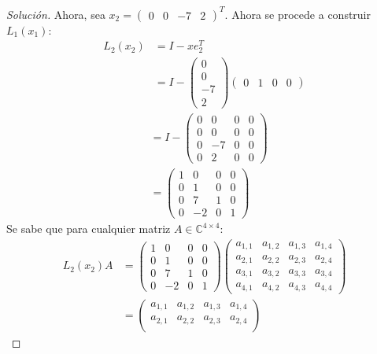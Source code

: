 \documentclass[12pt]{book}
\newcommand{\C}{\mathbb{C}}
\newenvironment{solucion}
  {\renewcommand\qedsymbol{$\square$}\begin{proof}[Solución]}
  {\end{proof}}
\begin{document}
\begin{solucion}
Ahora, sea $x_2=\begin{pmatrix}0&0&-7&2\end{pmatrix}^T$. Ahora se procede a construir $L_1(x_1)$:
\begin{align*}
    L_2(x_2)&=I-xe_2^T\\[8pt]
    &=I-\begin{pmatrix}
    0\\
    0\\
    -7\\
    2
    \end{pmatrix}\begin{pmatrix}
    0 & 1 & 0 & 0
    \end{pmatrix}
\end{align*}
\begin{align*}
    &= I-\begin{pmatrix}
    0 & 0 & 0 & 0\\
    0 & 0 & 0 & 0\\
    0 & -7 & 0 & 0\\
    0 & 2 & 0 & 0
    \end{pmatrix}\\[8pt]
    &=\begin{pmatrix}
    1 & 0 & 0 & 0\\
    0 & 1 & 0 & 0\\
    0 & 7 & 1 & 0\\
    0 & -2 & 0 & 1
    \end{pmatrix}
\end{align*}
Se sabe que para cualquier matriz $A\in\C^{4\times4}$:
\begin{align*}
    L_2(x_2)A&=\begin{pmatrix}
    1 & 0 & 0 & 0\\
    0 & 1 & 0 & 0\\
    0 & 7 & 1 & 0\\
    0 & -2 & 0 & 1
    \end{pmatrix}\begin{pmatrix}
    a_{1,1} & a_{1,2} & a_{1,3} & a_{1,4}\\
    a_{2,1} & a_{2,2} & a_{2,3} & a_{2,4}\\
    a_{3,1} & a_{3,2} & a_{3,3} & a_{3,4}\\
    a_{4,1} & a_{4,2} & a_{4,3} & a_{4,4}
    \end{pmatrix}\\[8pt]
    &=\begin{pmatrix}
    a_{1,1} & a_{1,2} & a_{1,3} & a_{1,4}\\
    a_{2,1} & a_{2,2} & a_{2,3} & a_{2,4}\\

\end{pmatrix}
\end{align*}
\end{solucion}
\end{document}
